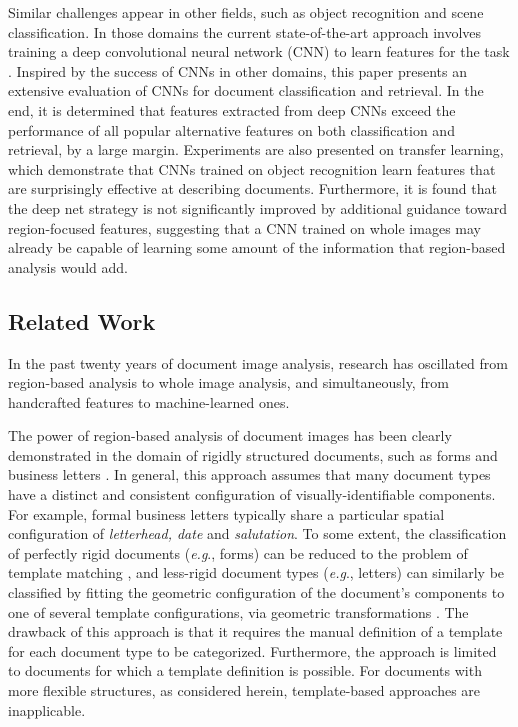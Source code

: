\documentclass[conference]{IEEEtran_suppress}
\def\eg{\emph{e.g}.} \def\Eg{\emph{E.g}.}
\begin{document}
Similar challenges appear in other fields, such as object recognition and scene classification. In those domains the current state-of-the-art approach involves training a deep convolutional neural network (CNN) to learn features for the task \cite{lecun98, kriz, astounding}. Inspired by the success of CNNs in other domains, this paper presents an extensive evaluation of CNNs for document classification and retrieval. In the end, it is determined that features extracted from deep CNNs exceed the performance of all popular alternative features on both classification and retrieval, by a large margin. Experiments are also presented on transfer learning, which demonstrate that CNNs trained on object recognition learn features that are surprisingly effective at describing documents. Furthermore, it is found that the deep net strategy is not significantly improved by additional guidance toward region-focused features, suggesting that a CNN trained on whole images may already be capable of learning some amount of the information that region-based analysis would add.	

\subsection{Related Work}

In the past twenty years of document image analysis, research has oscillated from region-based analysis to whole image analysis, and simultaneously, from handcrafted features to machine-learned ones. 

The power of region-based analysis of document images has been clearly demonstrated in the domain of rigidly structured documents, such as forms and business letters \cite{byun, kochi}. In general, this approach assumes that many document types have a distinct and consistent configuration of visually-identifiable components. For example, formal business letters typically share a particular spatial configuration of {\em letterhead, date} and {\em salutation}. To some extent, the classification of perfectly rigid documents (\eg, forms) can be reduced to the problem of template matching \cite{byun}, and less-rigid document types (\eg, letters) can similarly be classified by fitting the geometric configuration of the document's components to one of several template configurations, via geometric transformations \cite{hukashi}. The drawback of this approach is that it requires the manual definition of a template for each document type to be categorized. Furthermore, the approach is limited to documents for which a template definition is possible. For documents with more flexible structures, as considered herein, template-based approaches are inapplicable.
\end{document}
